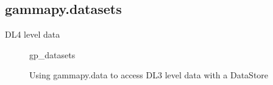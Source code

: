 \subsection{gammapy.datasets}
\label{ssec:gammapy-datasets}
DL4 level data

\begin{figure}

	{gp_datasets}
	\caption{Using gammapy.data to access DL3 level data with a DataStore}
	\label{fig*:minted:gp_datasets}
\end{figure}
